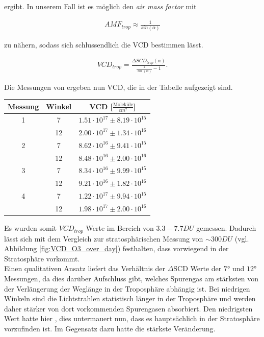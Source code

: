 \documentclass[12pt, a4paper, bibliography=totoc]{scrartcl}
\begin{document}
\begin{multicols}{2}
ergibt.
In unserem Fall ist es möglich den \textit{air mass factor} mit

\begin{align}
AMF_{trop} \approx \frac{1}{sin(\alpha)}
\end{align}

zu nähern, sodass sich schlussendlich die VCD bestimmen lässt.

\begin{align}
VCD_{trop} = \frac{\Delta SCD_{trop}(\alpha)}{\frac{1}{\sin(\alpha)}-1}.
\end{align}

Die Messungen von  ergeben nun VCD, die in der Tabelle aufgezeigt sind.

\begin{center}
	
	\begin{tabular*}{\linewidth}{c c c}
		\toprule
		Messung & Winkel & VCD [$\frac{\text{Moleküle}}{\si{cm}^2}$] \\
		\midrule
		1 & 7 & $1.51 \cdot 10^{17} \pm 8.19 \cdot 10^{15}$  \\
		& 12 & $2.00 \cdot 10^{17} \pm 1.34 \cdot 10^{16}$\\
		2 & 7 & $8.62 \cdot 10^{16} \pm 9.41 \cdot 10^{15}$ \\
		& 12 & $8.48 \cdot 10^{16} \pm 2.00 \cdot 10^{16}$\\
		3 & 7 &  $8.34 \cdot 10^{16} \pm 9.99 \cdot 10^{15}$\\
		& 12 & $9.21 \cdot 10^{16} \pm 1.82 \cdot 10^{16}$\\
		4 & 7 & $1.22 \cdot 10^{17} \pm 9.94 \cdot 10^{15}$ \\
		& 12 & $1.98 \cdot 10^{17} \pm 2.00 \cdot 10^{16}$\\
		\bottomrule
	\end{tabular*}
	\label{fig:VCD_O3_trop}
\end{center}

Es wurden somit $VCD_{trop}$ Werte im Bereich von $3.3 - 7.7 \si{DU}$ gemessen. Dadurch lässt sich mit dem Vergleich zur stratosphärischen Messung von $\sim 300 \si{DU}$ (vgl. Abbildung \ref{fig:VCD_O3_over_day}) festhalten, dass  vorwiegend in der Stratosphäre vorkommt.\\

Einen qualitativen Ansatz liefert das Verhältnis der $\Delta$SCD Werte der $7°$ und $12°$ Messungen, da dies darüber Aufschluss gibt, welches Spurengas am stärksten von der Verlängerung der Weglänge in der Troposphäre abhängig ist. 	
Bei niedrigen Winkeln sind die Lichtstrahlen statistisch länger in der Troposphäre und werden daher stärker von dort vorkommenden Spurengasen absorbiert.
Den niedrigsten Wert hatte hier , dies untermauert nun, dass es hauptsächlich in der Stratosphäre vorzufinden ist.
Im Gegensatz dazu hatte  die stärkste Veränderung. \\


\end{multicols}
\end{document}
